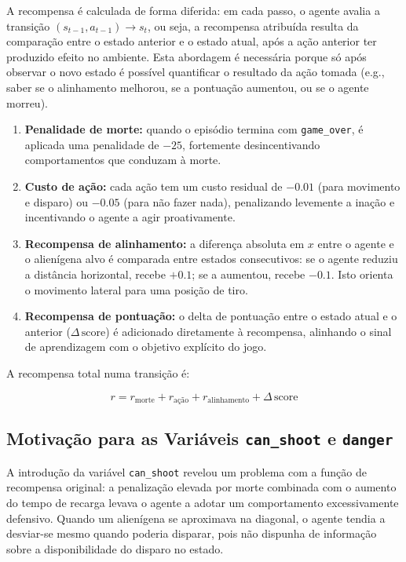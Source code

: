 \documentclass[12pt,a4paper]{article}
\begin{document}
A recompensa é calculada de forma diferida: em cada passo, o agente avalia a transição
$(s_{t-1}, a_{t-1}) \rightarrow s_t$, ou seja, a recompensa atribuída resulta da comparação
entre o estado anterior e o estado atual, após a ação anterior ter produzido efeito no
ambiente. Esta abordagem é necessária porque só após observar o novo estado é possível
quantificar o resultado da ação tomada (e.g., saber se o alinhamento melhorou, se a
pontuação aumentou, ou se o agente morreu).

\begin{enumerate}
    \item \textbf{Penalidade de morte:} quando o episódio termina com \texttt{game\_over}, é aplicada uma penalidade de $-25$, fortemente desincentivando comportamentos que conduzam à morte.
    
    \item \textbf{Custo de ação:} cada ação tem um custo residual de $-0.01$ (para movimento e disparo) ou $-0.05$ (para não fazer nada), penalizando levemente a inação e incentivando o agente a agir proativamente.
    
    \item \textbf{Recompensa de alinhamento:} a diferença absoluta em $x$ entre o agente e o alienígena alvo é comparada entre estados consecutivos: se o agente reduziu a distância horizontal, recebe $+0.1$; se a aumentou, recebe $-0.1$. Isto orienta o movimento lateral para uma posição de tiro.
    
    \item \textbf{Recompensa de pontuação:} o delta de pontuação entre o estado atual e o anterior ($\Delta\,\text{score}$) é adicionado diretamente à recompensa, alinhando o sinal de aprendizagem com o objetivo explícito do jogo.
\end{enumerate}

A recompensa total numa transição é:

\begin{equation}
    r = r_{\text{morte}} + r_{\text{ação}} + r_{\text{alinhamento}} + \Delta\,\text{score}
    \label{eq:recompensa}
\end{equation}

\subsection{Motivação para as Variáveis \texttt{can\_shoot} e \texttt{danger}}

A introdução da variável \texttt{can\_shoot} revelou um problema com a função de recompensa original: a penalização elevada por morte combinada com o aumento do tempo de recarga levava o agente a adotar um comportamento excessivamente defensivo. Quando um alienígena se aproximava na diagonal, o agente tendia a desviar-se mesmo quando poderia disparar, pois não dispunha de informação sobre a disponibilidade do disparo no estado.
\end{document}
